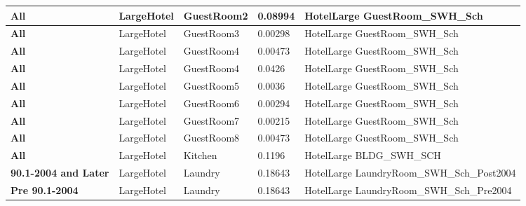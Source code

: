 \begin{table}
\begin{tabular}{|p{3cm}|p{3cm}|p{3cm}|p{3cm}|p{3cm}|}
\textbf{All}                     & LargeHotel            & GuestRoom2  & 0.08994 & HotelLarge   GuestRoom\_SWH\_Sch             \\ \hline
\textbf{All}                     & LargeHotel            & GuestRoom3  & 0.00298 & HotelLarge   GuestRoom\_SWH\_Sch             \\ \hline
\textbf{All}                     & LargeHotel            & GuestRoom4  & 0.00473 & HotelLarge   GuestRoom\_SWH\_Sch             \\ \hline
\textbf{All}                     & LargeHotel            & GuestRoom4  & 0.0426  & HotelLarge   GuestRoom\_SWH\_Sch             \\ \hline
\textbf{All}                     & LargeHotel            & GuestRoom5  & 0.0036  & HotelLarge   GuestRoom\_SWH\_Sch             \\ \hline
\textbf{All}                     & LargeHotel            & GuestRoom6  & 0.00294 & HotelLarge   GuestRoom\_SWH\_Sch             \\ \hline
\textbf{All}                     & LargeHotel            & GuestRoom7  & 0.00215 & HotelLarge   GuestRoom\_SWH\_Sch             \\ \hline
\textbf{All}                     & LargeHotel            & GuestRoom8  & 0.00473 & HotelLarge   GuestRoom\_SWH\_Sch             \\ \hline
\textbf{All}                     & LargeHotel            & Kitchen     & 0.1196  & HotelLarge   BLDG\_SWH\_SCH                  \\ \hline
\textbf{90.1-2004 and Later} & LargeHotel            & Laundry     & 0.18643 & HotelLarge   LaundryRoom\_SWH\_Sch\_Post2004 \\ \hline
\textbf{Pre 90.1-2004}  & LargeHotel            & Laundry     & 0.18643 & HotelLarge   LaundryRoom\_SWH\_Sch\_Pre2004  \\ \hline
\end{tabular}
\end{table}